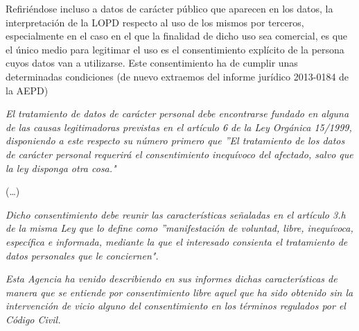 \leftskip=0pt
\rightskip=0pt




Refiriéndose incluso a datos de carácter público que aparecen en los datos,
la interpretación de la LOPD respecto al uso de los mismos por terceros, especialmente
en el caso en el que la finalidad de dicho uso sea comercial, es que el único medio
para legitimar el uso es el consentimiento explícito de la persona cuyos datos van 
a utilizarse. Este consentimiento ha de cumplir unas determinadas condiciones
(de nuevo extraemos del informe jurídico  2013-0184 de la AEPD)

\leftskip=1cm
\rightskip=1cm
{\em 
El tratamiento de datos de carácter personal debe encontrarse fundado
en alguna de las causas legitimadoras previstas en el artículo 6 de la Ley
Orgánica 15/1999, disponiendo a este respecto su número primero que ''El
tratamiento de los datos de carácter personal requerirá el consentimiento
inequívoco del afectado, salvo que la ley disponga otra cosa."}

\leftskip=1cm
\rightskip=1cm
(\dots)

\leftskip=1cm
\rightskip=1cm
{\em Dicho consentimiento debe reunir las características señaladas en el
artículo 3.h de la misma Ley que lo define como ''manifestación de
voluntad, libre, inequívoca, específica e informada, mediante la que el
interesado consienta el tratamiento de datos personales que le
conciernen".}

\leftskip=1cm
\rightskip=1cm
{\em Esta Agencia ha venido describiendo en sus informes dichas
características de manera que se entiende por consentimiento libre aquel que
ha sido obtenido sin la intervención de vicio alguno del consentimiento en los
términos regulados por el Código Civil.
}

\leftskip=0pt
\rightskip=0pt




